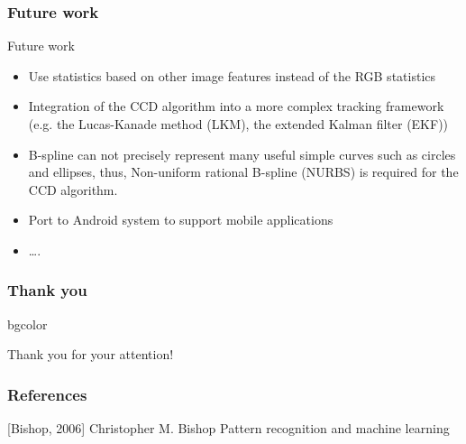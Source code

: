 \documentclass[english,10pt,presentation]{beamer}
\begin{document}
\begin{frame}
\frametitle{Future work}
\label{sec-6_2}
\begin{exampleblock}{Future work}
\label{sec-6_2_1}
\begin{itemize}

\item Use statistics based on other image features instead of the RGB statistics\\
\label{sec-6_2_1_1}%
\item Integration of the CCD algorithm into a more complex tracking framework (e.g. the Lucas-Kanade method (LKM), the extended Kalman  filter (EKF))\\
\label{sec-6_2_1_2}%
\item B-spline can not precisely represent many useful simple curves such as circles and ellipses, thus, Non-uniform rational B-spline (NURBS) is required for the CCD algorithm.\\
\label{sec-6_2_1_3}%
\item Port to Android system to support mobile applications\\
\label{sec-6_2_1_4}%
\item \ldots{}.\\
\label{sec-6_2_1_5}%
\end{itemize} %
\end{exampleblock}
\end{frame}
\begin{frame}
\frametitle{Thank you}
\label{sec-6_3}

\begin{beamercolorbox}[rounded=true, shadow=true, wd=10cm]{bgcolor}
\label{sec-6_3_1}

\begin{center}
\large Thank you for your attention!
\end{center}
\end{beamercolorbox}
\end{frame}
\begin{frame}
\frametitle{References}
\label{sec-6_4}

\begin{thebibliography}{10}
[Bishop, 2006]
Christopher M. Bishop
  \newblock Pattern recognition and machine learning
\end{thebibliography}
\end{frame}
\end{document}
